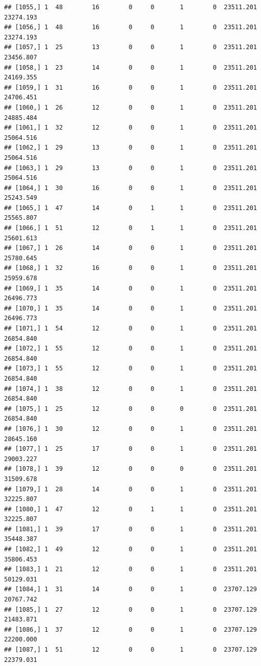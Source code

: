 \documentclass[
]{article}
\begin{document}
\begin{verbatim}
## [1055,] 1  48        16        0     0       1        0  23511.201  23274.193
## [1056,] 1  48        16        0     0       1        0  23511.201  23274.193
## [1057,] 1  25        13        0     0       1        0  23511.201  23456.807
## [1058,] 1  23        14        0     0       1        0  23511.201  24169.355
## [1059,] 1  31        16        0     0       1        0  23511.201  24706.451
## [1060,] 1  26        12        0     0       1        0  23511.201  24885.484
## [1061,] 1  32        12        0     0       1        0  23511.201  25064.516
## [1062,] 1  29        13        0     0       1        0  23511.201  25064.516
## [1063,] 1  29        13        0     0       1        0  23511.201  25064.516
## [1064,] 1  30        16        0     0       1        0  23511.201  25243.549
## [1065,] 1  47        14        0     1       1        0  23511.201  25565.807
## [1066,] 1  51        12        0     1       1        0  23511.201  25601.613
## [1067,] 1  26        14        0     0       1        0  23511.201  25780.645
## [1068,] 1  32        16        0     0       1        0  23511.201  25959.678
## [1069,] 1  35        14        0     0       1        0  23511.201  26496.773
## [1070,] 1  35        14        0     0       1        0  23511.201  26496.773
## [1071,] 1  54        12        0     0       1        0  23511.201  26854.840
## [1072,] 1  55        12        0     0       1        0  23511.201  26854.840
## [1073,] 1  55        12        0     0       1        0  23511.201  26854.840
## [1074,] 1  38        12        0     0       1        0  23511.201  26854.840
## [1075,] 1  25        12        0     0       0        0  23511.201  26854.840
## [1076,] 1  30        12        0     0       1        0  23511.201  28645.160
## [1077,] 1  25        17        0     0       1        0  23511.201  29003.227
## [1078,] 1  39        12        0     0       0        0  23511.201  31509.678
## [1079,] 1  28        14        0     0       1        0  23511.201  32225.807
## [1080,] 1  47        12        0     1       1        0  23511.201  32225.807
## [1081,] 1  39        17        0     0       1        0  23511.201  35448.387
## [1082,] 1  49        12        0     0       1        0  23511.201  35806.453
## [1083,] 1  21        12        0     0       1        0  23511.201  50129.031
## [1084,] 1  31        14        0     0       1        0  23707.129  20767.742
## [1085,] 1  27        12        0     0       1        0  23707.129  21483.871
## [1086,] 1  37        12        0     0       1        0  23707.129  22200.000
## [1087,] 1  51        12        0     0       1        0  23707.129  22379.031

\end{verbatim}
\end{document}
